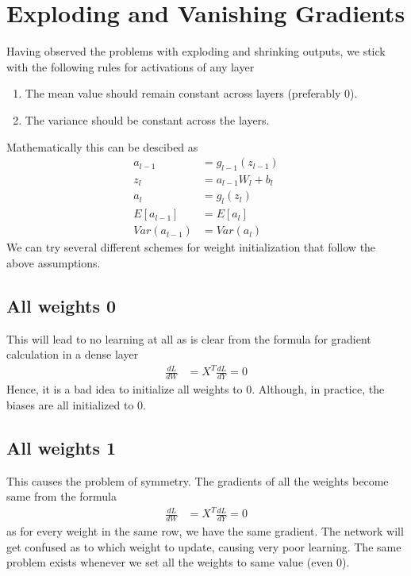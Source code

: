 \documentclass[../../deep_learning_notes.tex]{subfiles}
\begin{document}
\section{Exploding and Vanishing Gradients}
Having observed the problems with exploding and shrinking outputs, we stick with the following rules for activations of any layer
\begin{enumerate}
    \item The mean value should remain constant across layers (preferably $0$).
    \item The variance should be constant across the layers.
\end{enumerate}
Mathematically this can be descibed as
\begin{align*}
    a_{l-1} &= g_{l-1}(z_{l-1})\\
    z_{l} &= a_{l-1}W_{l} + b_{l}\\
    a_{l} &= g_{l}(z_{l})\\
    E[a_{l-1}] &= E[a_{l}]\\
    Var(a_{l-1}) &= Var(a_{l})
\end{align*}
We can try several different schemes for weight initialization that follow the above assumptions.


\subsection{All weights 0}
This will lead to no learning at all as is clear from the formula for gradient calculation in a dense layer
\begin{align*}
    \frac{dL}{dW} &= X^{T} \frac{dL}{dY} = 0
\end{align*}
Hence, it is a bad idea to initialize all weights to $0$. Although, in practice, the biases are all initialized to $0$.


\subsection{All weights 1}
This causes the problem of symmetry. The gradients of all the weights become same from the formula
\begin{align*}
    \frac{dL}{dW} &= X^{T} \frac{dL}{dY} = 0
\end{align*}
as for every weight in the same row, we have the same gradient. The network will get confused as to which weight to update, causing very poor learning. The same problem exists whenever we set all the weights to same value (even $0$).
\end{document}
